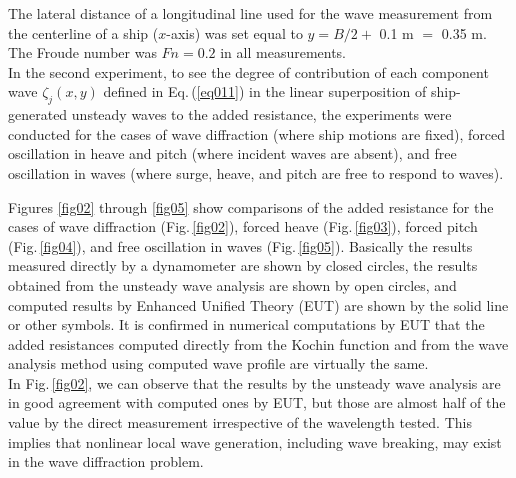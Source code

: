 \documentclass[11pt,fleqn,a3]{article}
\begin{document}
The lateral distance of a longitudinal line used for the wave 
measurement from the centerline of a ship ($x$-axis) was set equal 
to $y=B/2+$ 0.1 m $=$ 0.35 m.
The Froude number was $Fn=0.2$ in all measurements.
\\

In the second experiment, to see the degree of contribution of 
each component wave $\zeta_j (x, y)$ defined in Eq.\,(\ref{eq011}) 
in the linear superposition 
of ship-generated unsteady waves to the added resistance, 
the experiments were conducted for the cases of wave 
diffraction (where ship motions are fixed), forced oscillation 
in heave and pitch (where incident waves are absent), and 
free oscillation in waves (where surge, heave, and pitch are 
free to respond to waves).


\medskip%
\vspace{-0.2mm}\par
\noindent
Figures \ref{fig02} through \ref{fig05} show comparisons of the added 
resistance for the cases of wave diffraction (Fig.\,\ref{fig02}), 
forced heave (Fig.\,\ref{fig03}), forced pitch (Fig.\,\ref{fig04}), 
and free oscillation in waves (Fig.\,\ref{fig05}).
%
Basically the results measured directly by a dynamometer are shown by 
closed circles, the results obtained from the unsteady wave analysis are 
shown by open circles, and computed results by Enhanced Unified Theory (EUT) 
are shown by the solid line or other symbols.
It is confirmed in numerical computations by EUT that the added resistances 
computed directly from the Kochin function and from the wave 
analysis method using computed wave profile are virtually the same.
\\

In Fig.\,\ref{fig02}, we can observe that the results by the unsteady wave analysis 
are in good agreement with computed ones by EUT, but those are almost 
half of the value by the direct measurement irrespective of 
the wavelength tested.
This implies that nonlinear local wave generation, including wave breaking, 
may exist in the wave diffraction problem.
\\
\end{document}
